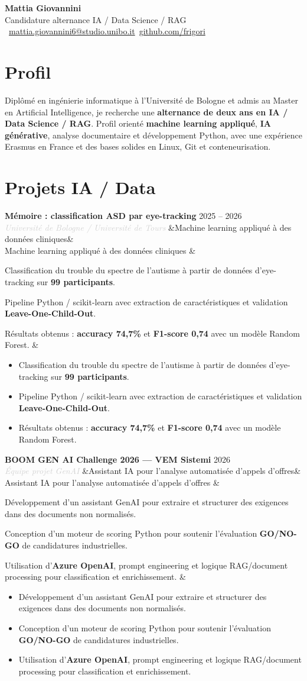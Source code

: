 \documentclass[a4paper,10pt]{article}
\newcommand{\entrylist}[5]{%
  \noindent\textbf{#1} \hfill \textcolor{accent}{#2}\\
  \textit{\textcolor{lightgray}{#3}}%
  \ifx&#4&\else\\[-0.05em]#4\fi
  \vspace{0.15em}
  \ifx&#5&\else\begin{itemize}#5\end{itemize}\fi
  \vspace{0.1em}
}
\begin{document}
\begin{center}
  {\Huge\bfseries\color{darkgray} Mattia Giovannini}\\[0.3em]
  {\large\color{accent} Candidature alternance IA / Data Science / RAG}\\[0.45em]
  \textcolor{lightgray}{\faEnvelope\ \href{mailto:mattia.giovannini6@studio.unibo.it}{mattia.giovannini6@studio.unibo.it}\quad\textbullet\quad\faGithub\ \href{https://github.com/frigori}{github.com/frigori}}
\end{center}

\section{Profil}
Diplômé en ingénierie informatique à l'Université de Bologne et admis au Master en Artificial Intelligence, je recherche une \textbf{alternance de deux ans en IA / Data Science / RAG}. Profil orienté \textbf{machine learning appliqué}, \textbf{IA générative}, analyse documentaire et développement Python, avec une expérience Erasmus en France et des bases solides en Linux, Git et conteneurisation.

\section{Projets IA / Data}

\entrylist{Mémoire : classification ASD par eye-tracking}{2025 -- 2026}{Université de Bologne / Université de Tours}{Machine learning appliqué à des données cliniques}{
  \item Classification du trouble du spectre de l'autisme à partir de données d'eye-tracking sur \textbf{99 participants}.
  \item Pipeline Python / scikit-learn avec extraction de caractéristiques et validation \textbf{Leave-One-Child-Out}.
  \item Résultats obtenus : \textbf{accuracy 74,7\%} et \textbf{F1-score 0,74} avec un modèle Random Forest.
}

\entrylist{BOOM GEN AI Challenge 2026 — VEM Sistemi}{2026}{Équipe projet GenAI}{Assistant IA pour l'analyse automatisée d'appels d'offres}{
  \item Développement d'un assistant GenAI pour extraire et structurer des exigences dans des documents non normalisés.
  \item Conception d'un moteur de scoring Python pour soutenir l'évaluation \textbf{GO/NO-GO} de candidatures industrielles.
  \item Utilisation d'\textbf{Azure OpenAI}, prompt engineering et logique RAG/document processing pour classification et enrichissement.
}
\end{document}
